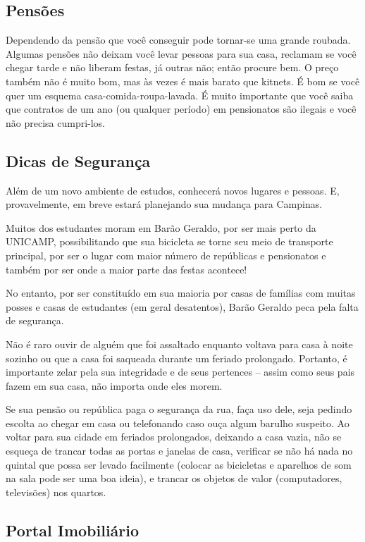 \subsection{Pensões}

Dependendo da pensão que você conseguir pode tornar-se uma grande roubada.
Algumas pensões não deixam você levar pessoas para sua casa, reclamam se você
chegar tarde e não liberam festas, já outras não; então procure bem. O preço
também não é muito bom, mas às vezes é mais barato que kitnets. É bom se você
quer um esquema casa-comida-roupa-lavada. É muito importante que você saiba que
contratos de um ano (ou qualquer período) em pensionatos são ilegais e você não
precisa cumpri-los.

\subsection{Dicas de Segurança}

Além de um novo ambiente de estudos, conhecerá novos lugares e pessoas. E,
provavelmente, em breve estará planejando sua mudança para Campinas.

Muitos dos estudantes moram em Barão Geraldo, por ser mais perto da UNICAMP,
possibilitando que sua bicicleta se torne seu meio de transporte principal, por
ser o lugar com maior número de repúblicas e pensionatos e também por ser onde
a maior parte das festas acontece!

No entanto, por ser constituído em sua maioria por casas de famílias com muitas
posses e casas de estudantes (em geral desatentos), Barão Geraldo peca pela
falta de segurança.

Não é raro ouvir de alguém que foi assaltado enquanto voltava para casa à noite
sozinho ou que a casa foi saqueada durante um feriado prolongado. Portanto,
é importante zelar pela sua integridade e de seus pertences -- assim como seus
pais fazem em sua casa, não importa onde eles morem.

Se sua pensão ou república paga o segurança da rua, faça uso dele, seja pedindo
escolta ao chegar em casa ou telefonando caso ouça algum barulho suspeito. Ao
voltar para sua cidade em feriados prolongados, deixando a casa vazia, não se
esqueça de trancar todas as portas e janelas de casa, verificar se não há nada
no quintal que possa ser levado facilmente (colocar as bicicletas e aparelhos de
som na sala pode ser uma boa ideia), e trancar os objetos de valor
(computadores, televisões) nos quartos.

\subsection{Portal Imobiliário}

